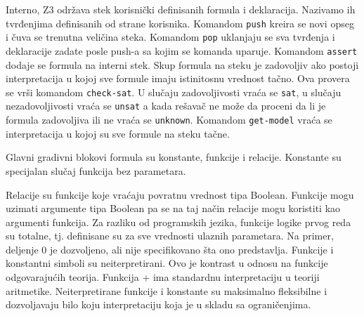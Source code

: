 \documentclass[12pt,oneside]{memoir}
\newtheorem{primer}{Primer}
\begin{document}
\par
Interno, Z3 održava stek korisnički definisanih formula i deklaracija. Nazivamo ih tvrđenjima definisanih od strane korisnika. Komandom \texttt{push} kreira se novi opseg i čuva se trenutna veličina steka. Komandom \texttt{pop} uklanjaju se sva tvrđenja i deklaracije zadate posle push-a sa kojim se komanda uparuje. Komandom \texttt{assert} dodaje se formula na interni stek. Skup formula na steku je zadovoljiv ako postoji interpretacija u kojoj sve formule imaju istinitosnu vrednost tačno. Ova provera se vrši komandom \texttt{check-sat}. U slučaju zadovoljivosti vraća se \texttt{sat}, u slučaju nezadovoljivosti vraća se \texttt{unsat} a kada rešavač ne može da proceni da li je formula zadovoljiva ili ne vraća se \texttt{unknown}. Komandom \texttt{get-model} vraća se interpretacija u kojoj su sve formule na steku tačne. 
\par
Glavni gradivni blokovi formula su konstante, funkcije i relacije. Konstante su specijalan slučaj funkcija bez parametara. 

Relacije su funkcije koje vraćaju povratnu vrednost tipa Boolean. Funkcije mogu uzimati argumente tipa Boolean pa se na taj način relacije mogu koristiti kao argumenti funkcija. Za razliku od programskih jezika, funkcije logike prvog reda su totalne, tj. definisane su za sve vrednosti ulaznih parametara. Na primer, deljenje 0 je dozvoljeno, ali nije specifikovano šta ono predstavlja. Funkcije i konstantni simboli su neiterpretirani. Ovo je kontrast u odnosu na funkcije odgovarajućih teorija. Funkcija + ima standardnu interpretaciju u teoriji aritmetike. Neiterpretirane funkcije i konstante su maksimalno fleksibilne i dozvoljavaju bilo koju interpretaciju koja je u skladu sa ograničenjima. 

\end{document}
